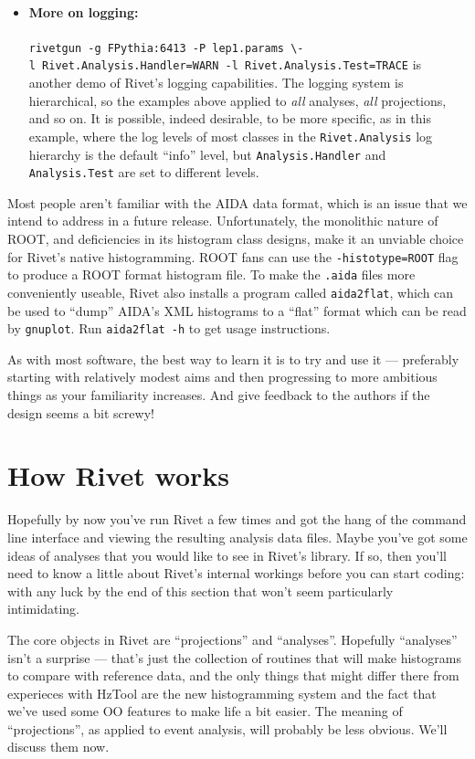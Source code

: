 \documentclass{JHEP3}
\newcommand{\kbd}[1]{\texttt{#1}\xspace}
\newcommand{\cmdbreak}{\textbackslash\newline}
\begin{document}
\begin{itemize}
\item \paragraph{More on logging:}{\kbd{rivetgun -g~FPythia:6413 -P~lep1.params
      \cmdbreak -l~Rivet.Analysis.Handler=WARN -l~Rivet.Analysis.Test=TRACE}
    is another demo of Rivet's logging capabilities. The logging system is
    hierarchical, so the examples above applied to \emph{all} analyses,
    \emph{all} projections, and so on. It is possible, indeed desirable, to be
    more specific, as in this example, where the log levels of most classes in
    the \kbd{Rivet.Analysis} log hierarchy is the default ``info'' level, but
    \kbd{Analysis.Handler} and \kbd{Analysis.Test} are set to different levels.}
\end{itemize}

Most people aren't familiar with the AIDA data format, which is an issue that we
intend to address in a future release. Unfortunately, the monolithic nature of
ROOT, and deficiencies in its histogram class designs, make it an unviable
choice for Rivet's native histogramming. ROOT fans can use the
\kbd{-\-histotype=ROOT} flag to produce a ROOT format histogram file. To make
the \kbd{.aida} files more conveniently useable, Rivet also installs a program
called \kbd{aida2flat}, which can be used to ``dump'' AIDA's XML histograms to a
``flat'' format which can be read by \kbd{gnuplot}. Run \kbd{aida2flat -h} to
get usage instructions.

As with most software, the best way to learn it is to try and use it ---
preferably starting with relatively modest aims and then progressing to more
ambitious things as your familiarity increases. And give feedback to the authors
if the design seems a bit screwy!



\section{How Rivet works}
Hopefully by now you've run Rivet a few times and got the hang of the command
line interface and viewing the resulting analysis data files. Maybe you've got
some ideas of analyses that you would like to see in Rivet's library. If so,
then you'll need to know a little about Rivet's internal workings before you can
start coding: with any luck by the end of this section that won't seem
particularly intimidating.

The core objects in Rivet are ``projections'' and ``analyses''. Hopefully
``analyses'' isn't a surprise --- that's just the collection of routines that
will make histograms to compare with reference data, and the only things that
might differ there from experieces with HzTool are the new histogramming system
and the fact that we've used some OO features to make life a bit easier. The
meaning of ``projections'', as applied to event analysis, will probably be less
obvious. We'll discuss them now.
\end{document}
